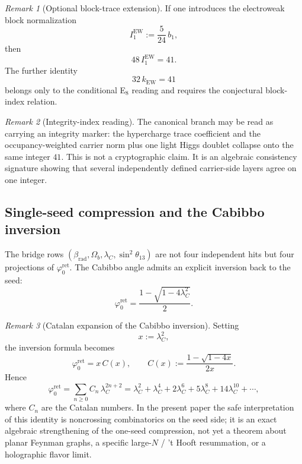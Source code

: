 \documentclass[11pt,a4paper]{article}
\theoremstyle{definition}
\theoremstyle{remark}
\newtheorem*{remark}{Remark}
\newcommand{\phiz}{\varphi_0^{\mathrm{ret}}}
\newcommand{\bone}{b_1}
\begin{document}
\begin{remark}[Optional block-trace extension]
If one introduces the electroweak block normalization
\[
I_1^{\mathrm{EW}}:=\frac{5}{24}\,\bone,
\]
then
\[
48\,I_1^{\mathrm{EW}}=41.
\]
The further identity
\[
32\,k_{\mathrm{EW}}=41
\]
belongs only to the conditional E$_8$ reading and requires the conjectural block-index relation.
\end{remark}

\begin{remark}[Integrity-index reading]
The canonical branch may be read as carrying an integrity marker: the hypercharge trace coefficient and the occupancy-weighted carrier norm plus one light Higgs doublet collapse onto the same integer $41$. This is not a cryptographic claim. It is an algebraic consistency signature showing that several independently defined carrier-side layers agree on one integer.
\end{remark}

\subsection{Single-seed compression and the Cabibbo inversion}

The bridge rows $(\beta_{\mathrm{rad}},\Omega_b,\lambda_C,\sin^2\theta_{13})$ are not four independent hits but four projections of $\phiz$. The Cabibbo angle admits an explicit inversion back to the seed:
\begin{equation}
\label{eq:cabibbo-inversion}
\phiz=\frac{1-\sqrt{1-4\lambda_C^2}}{2}.
\end{equation}
\begin{remark}[Catalan expansion of the Cabibbo inversion]
Setting
\[
x:=\lambda_C^2,
\]
the inversion formula becomes
\[
\phiz=x\,C(x),
\qquad
C(x):=\frac{1-\sqrt{1-4x}}{2x}.
\]
Hence
\begin{equation}
\label{eq:catalan-cabibbo}
\phiz
=
\sum_{n\ge 0} C_n\,\lambda_C^{2n+2}
=
\lambda_C^2+\lambda_C^4+2\lambda_C^6+5\lambda_C^8+14\lambda_C^{10}+\cdots,
\end{equation}
where $C_n$ are the Catalan numbers. In the present paper the safe interpretation of this identity is noncrossing combinatorics on the seed side; it is an exact algebraic strengthening of the one-seed compression, not yet a theorem about planar Feynman graphs, a specific large-$N$ / 't Hooft resummation, or a holographic flavor limit.
\end{remark}
\end{document}

